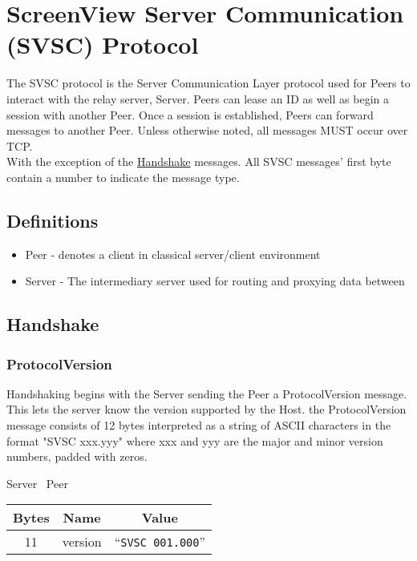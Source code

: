 \section{ScreenView Server Communication (SVSC) Protocol }

The SVSC protocol is the Server Communication Layer protocol used for Peers to interact with the relay server,
Server. Peers can lease an ID as well as begin a session with another Peer. Once a session is established, Peers can
forward messages to another Peer. Unless otherwise noted, all messages MUST occur over TCP.\\

With the exception of the \hyperlink{subsection.4.2}{Handshake} messages. All SVSC messages' first byte contain a
number to indicate
the message type.

\subsection{Definitions}

\begin{itemize}
    \item Peer - denotes a client in classical server/client environment
    \item Server - The intermediary server used for routing and proxying data between
\end{itemize}

\subsection{Handshake}

\subsubsection{ProtocolVersion}

Handshaking begins with the Server sending the Peer a ProtocolVersion message. This lets the server know
the version supported by the Host. the ProtocolVersion message consists of 12 bytes interpreted as a string of ASCII
characters in the format
"SVSC xxx.yyy" where xxx and yyy are the major and minor version numbers, padded with zeros.

\begin{center}
    Server \textrightarrow\ Peer\\
    \begin{tabular}{|c|c|c|}
        \hline
        \textbf{Bytes} & \textbf{Name} & \textbf{Value}            \\
        \hline
        11             & version       & ``\texttt{SVSC 001.000}'' \\
        \hline
    \end{tabular}
\end{center}

